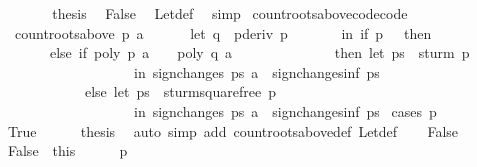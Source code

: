 \begin{isabellebody}
\ \ \ \ \isamarkupfalse%
\ \isamarkupfalse%
\ {\isacharquery}thesis\ \isamarkupfalse%
\ False\ \isamarkupfalse%
\ Let{\isacharunderscore}def\ \isamarkupfalse%
\ simp\isanewline
{}\isamarkupfalse%
%
\endisatagproof
{\isafoldproof}%
%
\isadelimproof
\isanewline
%
\endisadelimproof
\isanewline
\isanewline
{}\isamarkupfalse%
\ count{\isacharunderscore}roots{\isacharunderscore}above{\isacharunderscore}code{\isacharbrackleft}code{\isacharbrackright}{\isacharcolon}\isanewline
\ \ {\isachardoublequoteopen}count{\isacharunderscore}roots{\isacharunderscore}above\ p\ a\ {\isacharequal}\isanewline
\ \ \ \ \ {\isacharparenleft}let\ q\ {\isacharequal}\ pderiv\ p\isanewline
\ \ \ \ \ \ \ in\ if\ p\ {\isacharequal}\ {}\ then\ {}\isanewline
\ \ \ \ \ \ \ else\ if\ poly\ p\ a\ {\isasymnoteq}\ {}\ {\isasymor}\ poly\ q\ a\ {\isasymnoteq}\ {}\isanewline
\ \ \ \ \ \ \ \ \ \ \ \ then\ {\isacharparenleft}let\ ps\ {\isacharequal}\ sturm\ p\ \isanewline
\ \ \ \ \ \ \ \ \ \ \ \ \ \ \ \ \ \ \ in\ sign{\isacharunderscore}changes\ ps\ a\ {\isacharminus}\ sign{\isacharunderscore}changes{\isacharunderscore}inf\ ps{\isacharparenright}\isanewline
\ \ \ \ \ \ \ \ \ \ \ \ else\ {\isacharparenleft}let\ ps\ {\isacharequal}\ sturm{\isacharunderscore}squarefree\ p\isanewline
\ \ \ \ \ \ \ \ \ \ \ \ \ \ \ \ \ \ \ in\ sign{\isacharunderscore}changes\ ps\ a\ {\isacharminus}\ sign{\isacharunderscore}changes{\isacharunderscore}inf\ ps{\isacharparenright}{\isacharparenright}{\isachardoublequoteclose}\isanewline
%
\isadelimproof
%
\endisadelimproof
%
\isatagproof
{}\isamarkupfalse%
\ {\isacharparenleft}cases\ {\isachardoublequoteopen}p\ {\isacharequal}\ {}{\isachardoublequoteclose}{\isacharparenright}\isanewline
\ \ \isamarkupfalse%
\ True\isanewline
\ \ \ \ \isamarkupfalse%
\ {\isacharquery}thesis\ \isamarkupfalse%
\ {\isacharparenleft}auto\ simp\ add{\isacharcolon}\ count{\isacharunderscore}roots{\isacharunderscore}above{\isacharunderscore}def\ Let{\isacharunderscore}def{\isacharparenright}\isanewline
{}\isamarkupfalse%
\isanewline
\ \ \isamarkupfalse%
\ False\isanewline
\ \ \ \ \isamarkupfalse%
\ False{}\ {\isacharequal}\ this\isanewline
\ \ \ \ \isamarkupfalse%
\ {\isachardoublequoteopen}p\ {\isasymnoteq}\ {}{\isachardoublequoteclose}\ \isamarkupfalse%

\end{isabellebody}
